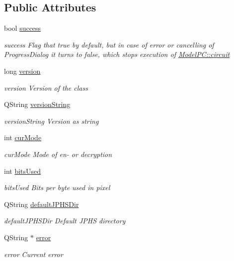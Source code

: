 \subsection*{Public Attributes}
\begin{DoxyCompactItemize}
\item 
bool \hyperlink{class_model_p_c_a945ffbbc44a832b953c191debd448f4c}{success}
\begin{DoxyCompactList}\small\item\em success Flag that true by default, but in case of error or cancelling of Progress\-Dialog it turns to false, which stops execution of \hyperlink{class_model_p_c_a1d0091062a0c836b283ec2f67411623b}{Model\-P\-C\-::circuit} \end{DoxyCompactList}\item 
long \hyperlink{class_model_p_c_a5af48ab89e19be42a94c34ba00249401}{version}
\begin{DoxyCompactList}\small\item\em version Version of the class \end{DoxyCompactList}\item 
Q\-String \hyperlink{class_model_p_c_a5f426725ccf7eefd3c77ea8c720264c9}{version\-String}
\begin{DoxyCompactList}\small\item\em version\-String Version as string \end{DoxyCompactList}\item 
int \hyperlink{class_model_p_c_ad74974ac236182c1d6d2cf0729fac3dd}{cur\-Mode}
\begin{DoxyCompactList}\small\item\em cur\-Mode Mode of en-\/ or decryption \end{DoxyCompactList}\item 
int \hyperlink{class_model_p_c_a655deb6a8afa94c7f4aadb3056989038}{bits\-Used}
\begin{DoxyCompactList}\small\item\em bits\-Used Bits per byte used in pixel \end{DoxyCompactList}\item 
Q\-String \hyperlink{class_model_p_c_abd038306f14f22fb885a1697c96d6335}{default\-J\-P\-H\-S\-Dir}
\begin{DoxyCompactList}\small\item\em default\-J\-P\-H\-S\-Dir Default J\-P\-H\-S directory \end{DoxyCompactList}\item 
Q\-String $\ast$ \hyperlink{class_model_p_c_a4e5a9c0ca1f06fe5bc478b6bf248c37c}{error}
\begin{DoxyCompactList}\small\item\em error Current error \end{DoxyCompactList}\end{DoxyCompactItemize}
